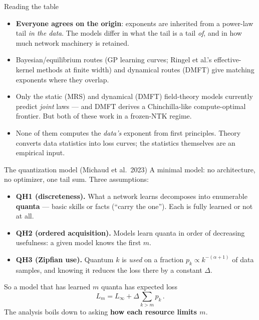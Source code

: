\documentclass[11pt]{beamer}
\newcommand{\hl}[1]{{\color{blue!60!black}\textbf{#1}}}
\begin{document}
\begin{frame}{Reading the table}
  \begin{itemize}
    \item \hl{Everyone agrees on the origin}: exponents are inherited
      from a power-law tail \emph{in the data}. %
      The models
      differ in what the tail is a tail \emph{of}, and in how much
      network machinery is retained.
    \item Bayesian/equilibrium routes (GP learning curves; Ringel et
      al.'s effective-kernel methods at finite width) and dynamical
      routes (DMFT) give matching exponents where they overlap.
      
    \item Only the static (MRS) and dynamical (DMFT) field-theory models
      currently predict \emph{joint} laws --- and DMFT derives a
      Chinchilla-like compute-optimal frontier. But both of these work in a frozen-NTK regime.
    \item None of them computes the \emph{data's} exponent from first
      principles. Theory converts data statistics into loss curves; the
      statistics themselves are an empirical input.
  \end{itemize}
\end{frame}

\begin{frame}{The quantization model (Michaud et al.\ 2023)}
  A minimal model: no architecture, no optimizer, one tail sum. Three
  assumptions:
  \begin{itemize}
    \item \textbf{QH1 (discreteness).} What a network learns decomposes
      into enumerable \hl{quanta} --- basic skills or facts (``carry
      the one''). Each is fully learned or not at all.  \pause
    \item \textbf{QH2 (ordered acquisition).} Models learn quanta in
      order of decreasing usefulness: a given model knows the first $m$.  \pause
    \item \textbf{QH3 (Zipfian use).} Quantum $k$ is \emph{used} on a
      fraction $p_k \propto k^{-(\alpha+1)}$ of data samples, and knowing it
      reduces the loss there by a constant $\Delta$.  \pause
  \end{itemize}
  So a model that has learned $m$ quanta has expected loss
  \[
    L_m = L_\infty + \Delta \sum_{k > m} p_k\,.
  \]
  The analysis boils down to asking \hl{how each
  resource limits $m$}.
\end{frame}
\end{document}
